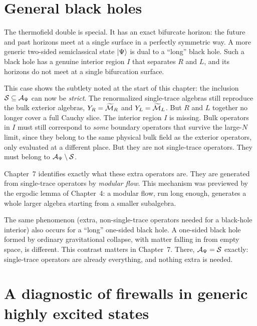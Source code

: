 \section{General black holes}

The thermofield double is special. It has an exact bifurcate horizon: the future and past horizons meet at a
single surface in a perfectly symmetric way. A more generic two-sided semiclassical state $\ket\Psi$ is dual to
a ``long'' black hole. Such a black hole has a genuine interior region $I$ that separates $R$ and $L$, and its
horizons do not meet at a single bifurcation surface.

This case shows the subtlety noted at the start of this chapter: the inclusion $\mathcal{S}\subseteq\mathcal{A}_\Psi$ can
now be \emph{strict}. The renormalized single-trace algebras still reproduce the bulk exterior algebras,
$Y_R=\widetilde{\mathcal{M}}_R$ and $Y_L=\widetilde{\mathcal{M}}_L$. But $R$ and $L$ together no longer cover a full Cauchy slice. The
interior region $I$ is missing. Bulk operators in $I$ must still correspond to \emph{some} boundary operators
that survive the large-$N$ limit, since they belong to the same physical bulk field as the exterior operators,
only evaluated at a different place. But they are not single-trace operators. They must belong to
$\mathcal{A}_\Psi\setminus\mathcal{S}$.

Chapter~7 identifies exactly what these extra operators are. They are generated from single-trace operators by
\emph{modular flow}. This mechanism was previewed by the ergodic lemma of Chapter~4: a modular flow, run long
enough, generates a whole larger algebra starting from a smaller subalgebra.

The same phenomenon (extra, non-single-trace operators needed for a black-hole interior) also occurs for a
``long'' one-sided black hole. A one-sided black hole formed by ordinary gravitational collapse, with matter
falling in from empty space, is different. This contrast matters in Chapter~7. There, $\mathcal{A}_\Psi=\mathcal{S}$
exactly: single-trace operators are already everything, and nothing extra is needed.

\section{A diagnostic of firewalls in generic highly excited states}

